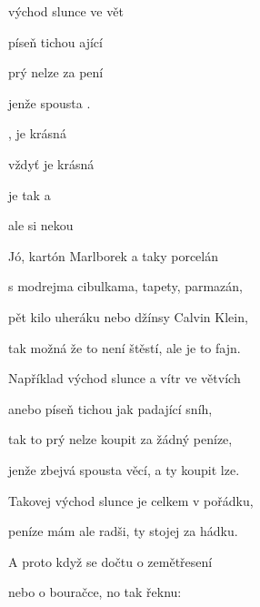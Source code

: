 

\zs
{} východ slunce  ve vět  

 píseň tichou ající   

 prý nelze  za  pení

jenže  spousta    .
\ks

\zs
{} ,  je krásná   

vždyť   je krásná   

 je tak  a  

ale  si  nekou
\ks

\zs
Jó, kartón Marlborek a taky porcelán

s modrejma cibulkama, tapety, parmazán,

pět kilo uheráku nebo džínsy Calvin Klein,

tak možná že to není štěstí, ale je to fajn.
\ks

\zr
Například východ slunce a vítr ve větvích

anebo píseň tichou jak padající sníh,

tak to prý nelze koupit za žádný peníze,

jenže zbejvá spousta věcí, a ty koupit lze.
\kr

\zs
Takovej východ slunce je celkem v pořádku,

peníze mám ale radši, ty stojej za hádku.

A proto když se dočtu o zemětřesení

nebo o bouračce, no tak řeknu: 
\ks

\zr  \kr  \zr  \kr

\kp
